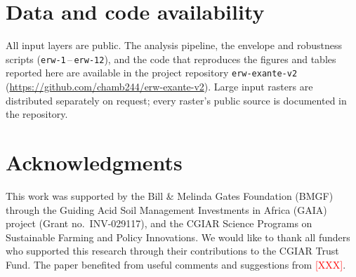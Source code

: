 \documentclass[12pt]{article}
\newcommand{\todo}[1]{\textcolor{red}{[#1]}}
\begin{document}
\section*{Data and code availability}
All input layers are public. The analysis pipeline, the envelope and robustness
scripts (\texttt{erw-1}\,--\,\texttt{erw-12}), and the code that reproduces the
figures and tables reported here are available in the project repository
\texttt{erw-exante-v2} (\url{https://github.com/chamb244/erw-exante-v2}).
Large input rasters are distributed
separately on request; every raster's public source is documented in the
repository.

\section*{Acknowledgments}
This work was supported by the Bill \& Melinda Gates Foundation (BMGF) through
the Guiding Acid Soil Management Investments in Africa (GAIA) project (Grant
no.\ INV-029117), and the CGIAR Science Programs on Sustainable Farming and
Policy Innovations. We would like to thank all funders who supported this
research through their contributions to the CGIAR Trust Fund. The paper
benefited from useful comments and suggestions from \todo{XXX}.



\end{document}

